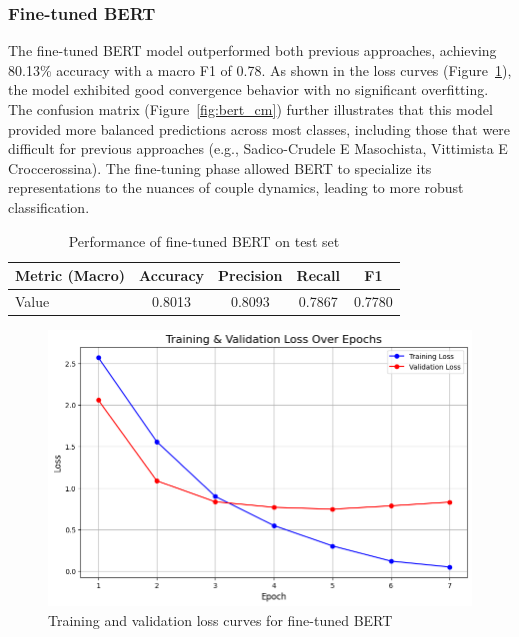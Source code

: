 \documentclass[conference]{IEEEtran}
\begin{document}
\vspace{1em}

\subsubsection{Fine-tuned BERT}
\noindent

The fine-tuned BERT model outperformed both previous approaches, achieving 80.13\% accuracy with a macro F1 of 0.78. As shown in the loss curves (Figure~\ref{fig:bert_loss}), the model exhibited good convergence behavior with no significant overfitting. The confusion matrix (Figure~\ref{fig:bert_cm}) further illustrates that this model provided more balanced predictions across most classes, including those that were difficult for previous approaches (e.g., Sadico-Crudele E Masochista, Vittimista E Croccerossina). The fine-tuning phase allowed BERT to specialize its representations to the nuances of couple dynamics, leading to more robust classification.

\begin{table}[H]
  \centering
  \begin{tabular}{lcccc}
    \toprule
    \textbf{Metric (Macro)} & \textbf{Accuracy} & \textbf{Precision} & \textbf{Recall} & \textbf{F1} \\
    \midrule
    Value & 0.8013 & 0.8093 & 0.7867 & 0.7780 \\
    \bottomrule
  \end{tabular}
  \caption{Performance of fine-tuned BERT on test set}
\end{table}

\begin{figure}[H]
  \centering
  \includegraphics[width=\columnwidth]{figures/bert_finetuned_loss_curves.png}
  \caption{Training and validation loss curves for fine-tuned BERT}
  \label{fig:bert_loss}
\end{figure}
\end{document}
